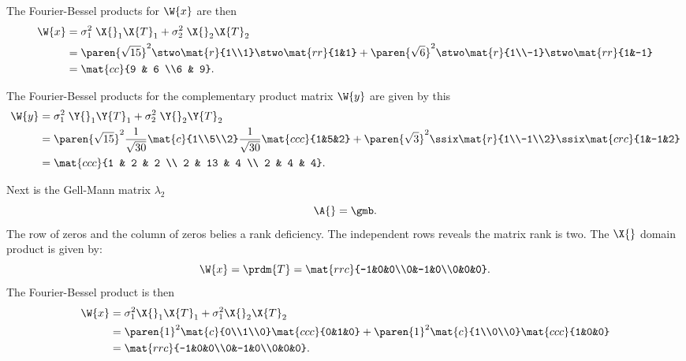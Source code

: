 The Fourier-Bessel products for $\W{x}$ are then
\begin{equation}
  \begin{split}
    \W{x} &= \sigma_{1}^{2}\; \X{}_{1}\X{T}_{1} + \sigma_{2}^{2}\; \X{}_{2}\X{T}_{2}\\
    &= \paren{\sqrt{15}}^{2}\stwo \mat{r}{1\\1}\stwo \mat{rr}{1&1} +  \paren{\sqrt{6}}^{2}\stwo \mat{r}{1\\-1}\stwo \mat{rr}{1&-1}\\
    &= \mat{cc}{9 & 6 \\6 & 9}.
  \end{split}
\end{equation}

The Fourier-Bessel products for the complementary product matrix $\W{y}$ are given by this
\begin{equation}
  \begin{split}
    \W{y} &= \sigma_{1}^{2}\; \Y{}_{1}\Y{T}_{1} + \sigma_{2}^{2}\; \Y{}_{2}\Y{T}_{2}\\
    &= \paren{\sqrt{15}}^{2}\frac{1}{\sqrt{30}} \mat{c}{1\\5\\2}\frac{1}{\sqrt{30}} \mat{ccc}{1&5&2} +  \paren{\sqrt{3}}^{2}\ssix \mat{r}{1\\-1\\2}\ssix \mat{crc}{1&-1&2}\\
    &= \mat{ccc}{1 & 2 & 2 \\ 2 & 13 & 4 \\ 2 & 4 & 4}.
  \end{split}
\end{equation}

Next is the Gell-Mann matrix $\lambda_{2}$
\begin{equation}
  \A{} = \gmb.
\end{equation}
The row of zeros and the column of zeros belies a rank deficiency. The independent rows reveals the matrix rank is two. The $\X{}$ domain product is given by:
\begin{equation}
  \W{x} = \prdm{T} = \mat{rrc}{-1&0&0\\0&-1&0\\0&0&0}.
\end{equation}
The Fourier-Bessel product is then
\begin{equation}
  \begin{split}
    \W{x} &= \sigma_{1}^{2} \X{}_{1}\X{T}_{1} + \sigma_{1}^{2} \X{}_{2}\X{T}_{2}\\
      &= \paren{1}^{2} \mat{c}{0\\1\\0} \mat{ccc}{0&1&0} + \paren{1}^{2} \mat{c}{1\\0\\0} \mat{ccc}{1&0&0}\\
      &= \mat{rrc}{-1&0&0\\0&-1&0\\0&0&0}.
  \end{split}
\end{equation}

